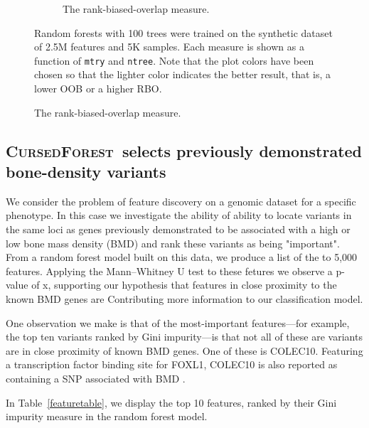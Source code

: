 \documentclass[10pt,letterpaper]{article}
\newcommand{\cursedforest}{\textsc{CursedForest}\xspace}
\newcommand{\mtry}{\texttt{mtry}\xspace}
\newcommand{\ntree}{\texttt{ntree}\xspace}
\begin{document}
\begin{figure}[tbhp]
\begin{adjustwidth}{-1.00in}{0in}
\begin{subfigure}[b]{0.5\linewidth}
      \caption{The rank-biased-overlap measure.} 
      \label{figure:rbo-prod.png} 
      \vspace{4ex}
    \end{subfigure} 
    \begin{flushleft} 
      Random forests with 100 trees were trained on the synthetic dataset of 2.5M features and 5K samples.
      Each measure is shown as a function of \mtry and \ntree. Note that the plot colors have been chosen so that the lighter color indicates
      the better result, that is, a lower OOB or a higher RBO.
    \end{flushleft}
  \end{adjustwidth}
\end{figure}

\subsection{\cursedforest\ selects previously demonstrated bone-density variants}
We consider the problem of feature discovery on a genomic dataset for a specific phenotype.
In this case we investigate the ability of  ability to locate variants in the same loci as genes previously demonstrated to
be associated with a high or low bone mass density (BMD) and rank these variants as being "important".
From a random forest model built on this data, we produce a list of the to 5,000 features. 
Applying the Mann–Whitney U test to these fetures we observe a p-value of x, supporting our
hypothesis that features in close proximity to the known BMD genes are Contributing more information to our classification model.

One observation we make is that of the most-important features---for example, the top ten variants ranked by Gini impurity---is
that not all of these are variants are in close proximity of known BMD genes.
One of these is COLEC10. Featuring a transcription factor binding site for FOXL1, COLEC10 is also reported as containing a SNP
associated with BMD \cite{Liu2008}.


In Table~\ref{featuretable}, we display the top 10 features, ranked by their Gini impurity measure in the random forest model.
\end{document}
